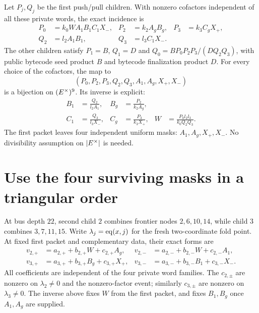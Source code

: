 \documentclass[11pt]{article}
\begin{document}
Let $P_j,Q_j$ be the first push/pull children. With nonzero cofactors independent of all these private words, the exact incidence is
\[
\begin{aligned}
 P_0&=k_0WA_1B_1C_1X_-,& P_2&=k_2A_gB_g,& P_3&=k_3C_gX_+,\\
 Q_2&=l_2A_1B_1,& Q_3&=l_3C_1X_-.
\end{aligned}
\]
The other children satisfy $P_1=B$, $Q_1=D$ and $Q_0=BP_0P_2P_3/(DQ_2Q_3)$, with public bytecode seed product $B$ and bytecode finalization product $D$. For every choice of the cofactors, the map to
\[
 (P_0,P_2,P_3,Q_2,Q_3,A_1,A_g,X_+,X_-)
\]
is a bijection on $(E^\times)^9$. Its inverse is explicit:
\[
\begin{aligned}
 B_1&=\frac{Q_2}{l_2A_1},& B_g&=\frac{P_2}{k_2A_g},\\
 C_1&=\frac{Q_3}{l_3X_-},& C_g&=\frac{P_3}{k_3X_+},&
 W&=\frac{P_0l_2l_3}{k_0Q_2Q_3}.
\end{aligned}
\]
The first packet leaves four independent uniform masks: $A_1,A_g,X_+,X_-$. No divisibility assumption on $|E^\times|$ is needed.

\section{Use the four surviving masks in a triangular order}

At bus depth $22$, second child $2$ combines frontier nodes $2,6,10,14$, while child $3$ combines $3,7,11,15$. Write $\lambda_j=\operatorname{eq}(x,j)$ for the fresh two-coordinate fold point. At fixed first packet and complementary data, their exact forms are
\[
\begin{aligned}
 v_{2,+}&=a_{2,+}+b_{2,+}W+c_{2,+}A_g,&
 v_{2,-}&=a_{2,-}+b_{2,-}W+c_{2,-}A_1,\\
 v_{3,+}&=a_{3,+}+b_{3,+}B_g+c_{3,+}X_+,&
 v_{3,-}&=a_{3,-}+b_{3,-}B_1+c_{3,-}X_-.
\end{aligned}
\]
All coefficients are independent of the four private word families. The $c_{2,\pm}$ are nonzero on $\lambda_2\ne0$ and the nonzero-factor event; similarly $c_{3,\pm}$ are nonzero on $\lambda_3\ne0$. The inverse above fixes $W$ from the first packet, and fixes $B_1,B_g$ once $A_1,A_g$ are supplied.
\end{document}
